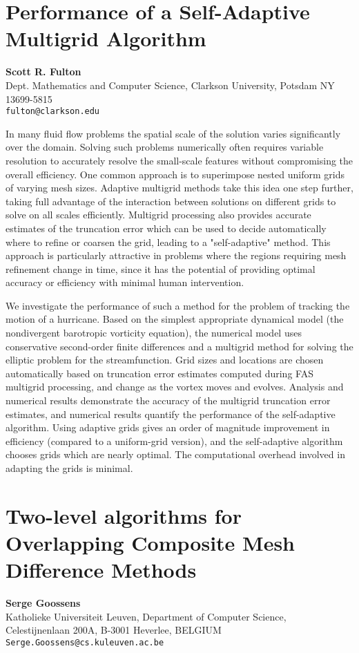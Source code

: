 \documentclass[11pt]{article}
\newcommand{\nextab}[4]{
	\section{#2}
	{\bf #1} \\ \nopagebreak
	{#3} \\ \nopagebreak
	{\tt #4} \nopagebreak
	}
\begin{document}

\nextab{Scott R. Fulton}
	{Performance of a Self-Adaptive Multigrid Algorithm}
	{Dept. Mathematics and Computer Science,
		Clarkson University, Potsdam NY 13699-5815}
	{fulton@clarkson.edu}

In many fluid flow problems the spatial scale of the solution varies
significantly over the domain.  Solving such problems numerically often
requires variable resolution to accurately resolve the small-scale
features without compromising the overall efficiency.  One common approach
is to superimpose nested uniform grids of varying mesh sizes.  Adaptive
multigrid methods take this idea one step further, taking full advantage
of the interaction between solutions on different grids to solve on all
scales efficiently.  Multigrid processing also provides accurate estimates
of the truncation error which can be used to decide automatically where to
refine or coarsen the grid, leading to a "self-adaptive" method.
This approach is particularly attractive in problems where the regions
requiring mesh refinement change in time, since it has
the potential of providing optimal accuracy or efficiency
with minimal human intervention.

We investigate the performance of such a method for the problem of
tracking the motion of a hurricane.
Based on the simplest appropriate dynamical model
(the nondivergent barotropic vorticity equation),
the numerical model uses conservative second-order finite differences
and a multigrid method for solving the elliptic problem for the
streamfunction.
Grid sizes and locations are chosen automatically based on truncation
error estimates computed during FAS multigrid processing,
and change as the vortex moves and evolves.
Analysis and numerical results demonstrate the accuracy of the multigrid
truncation error estimates, and
numerical results quantify the performance of the self-adaptive algorithm.
Using adaptive grids gives an order of magnitude improvement in
efficiency (compared to a uniform-grid version), and the self-adaptive
algorithm chooses grids which are nearly optimal.
The computational overhead involved in adapting the grids is minimal.


\nextab{Serge Goossens}
	{Two-level algorithms for Overlapping Composite
		Mesh Difference Methods}
	{Katholieke Universiteit Leuven, Department of Computer Science,
		Celestijnenlaan 200A, B-3001 Heverlee, BELGIUM}
	{Serge.Goossens@cs.kuleuven.ac.be}
\end{document}
